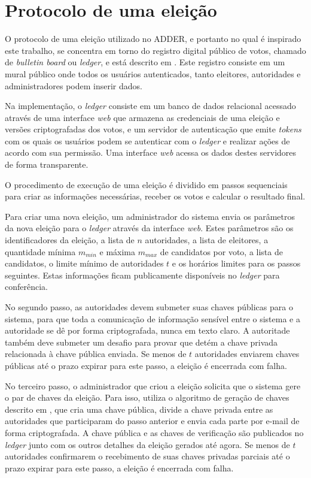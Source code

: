 \section{Protocolo de uma eleição}

O protocolo de uma eleição utilizado no ADDER, e portanto no qual é inspirado
este trabalho, se concentra em torno do registro digital público de votos,
chamado de \textit{bulletin board} ou \textit{ledger}, e está descrito em
\textcite{benaloh1987verifiable}. Este registro consiste em um mural público
onde todos os usuários autenticados, tanto eleitores, autoridades e
administradores podem inserir dados.

Na implementação, o \textit{ledger} consiste em um banco de dados relacional
acessado através de uma interface \textit{web} que armazena as credenciais de
uma eleição e versões criptografadas dos votos, e um servidor de autenticação
que emite \textit{tokens} com os quais os usuários podem se autenticar com o
\textit{ledger} e realizar ações de acordo com sua permissão. Uma interface
\textit{web} acessa os dados destes servidores de forma transparente.

O procedimento de execução de uma eleição é dividido em passos sequenciais para
criar as informações necessárias, receber os votos e calcular o resultado
final.

Para criar uma nova eleição, um administrador do sistema envia os parâmetros da
nova eleição para o \textit{ledger} através da interface \textit{web}. Estes
parâmetros são os identificadores da eleição, a lista de $n$ autoridades, a
lista de eleitores, a quantidade mínima $m_{min}$ e máxima $m_{max}$ de
candidatos por voto, a lista de candidatos, o limite mínimo de autoridades $t$
e os horários limites para os passos seguintes. Estas informações ficam
publicamente disponíveis no \textit{ledger} para conferência.

No segundo passo, as autoridades devem submeter suas chaves públicas para o
sistema, para que toda a comunicação de informação sensível entre o sistema e a
autoridade se dê por forma criptografada, nunca em texto claro. A autoritade
também deve submeter um desafio para provar que detém a chave privada
relacionada à chave pública enviada. Se menos de $t$ autoridades enviarem
chaves públicas até o prazo expirar para este passo, a eleição é encerrada com
falha.

No terceiro passo, o administrador que criou a eleição solicita que o sistema
gere o par de chaves da eleição. Para isso, utiliza o algoritmo de geração de
chaves descrito em \textcite{fouque2000sharing}, que cria uma chave pública,
divide a chave privada entre as autoridades que participaram do passo anterior
e envia cada parte por e-mail de forma criptografada. A chave pública e as
chaves de verificação são publicados no \textit{ledger} junto com os outros
detalhes da eleição gerados até agora. Se menos de $t$ autoridades confirmarem
o recebimento de suas chaves privadas parciais até o prazo expirar para este
passo, a eleição é encerrada com falha.

